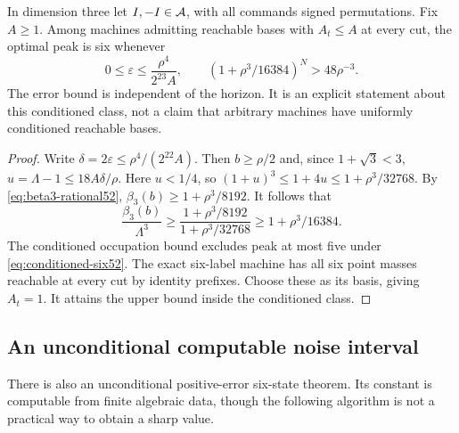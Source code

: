 \begin{corollary}
\label{cor:conditioned-six52}
In dimension three let $I,-I\in\mathcal A$, with all commands signed
permutations. Fix $A\ge1$. Among machines admitting reachable bases
with $A_t\le A$ at every cut, the optimal peak is six whenever
\begin{equation}\label{eq:conditioned-six52}
 0\le\varepsilon\le\frac{\rho^4}{2^{23}A},\qquad
 (1+\rho^3/16384)^N>48\rho^{-3}.
\end{equation}
The error bound is independent of the horizon. It is an explicit
statement about this conditioned class, not a claim that arbitrary
machines have uniformly conditioned reachable bases.
\end{corollary}
\begin{proof}
Write $\delta=2\varepsilon\le\rho^4/(2^{22}A)$. Then $b\ge\rho/2$
and, since $1+\sqrt3<3$, $u=\Lambda-1\le18A\delta/\rho$.
Here $u<1/4$, so $(1+u)^3\le1+4u\le1+\rho^3/32768$.
By \eqref{eq:beta3-rational52}, $\beta_3(b)\ge1+\rho^3/8192$.
It follows that
\[
 \frac{\beta_3(b)}{\Lambda^3}
 \ge\frac{1+\rho^3/8192}{1+\rho^3/32768}
 \ge1+\rho^3/16384.
\]
The conditioned occupation bound excludes peak at most five under
\eqref{eq:conditioned-six52}. The exact six-label machine has all
six point masses reachable at every cut by identity prefixes. Choose
these as its basis, giving $A_t=1$. It attains the upper bound inside
the conditioned class.
\end{proof}

\subsection{An unconditional computable noise interval}
There is also an unconditional positive-error six-state theorem. Its
constant is computable from finite algebraic data, though the following
algorithm is not a practical way to obtain a sharp value.


